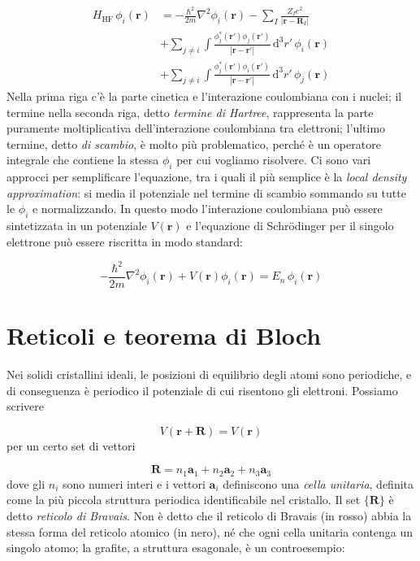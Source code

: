 \documentclass[a4paper]{report}
\begin{document}
\begin{equation}
\begin{split}
    H_{\text{HF}} \,\phi_i(\mathbf{r}) & = -\frac{\hbar^2}{2m}\nabla^2 \phi_i(\mathbf{r}) - \sum_I \frac{Z_I e^2}{|\mathbf{r}-\mathbf{R}_I|}  \\
    & + \sum_{j\neq i} \int \frac{\phi_j^{*}(\mathbf{r}') \phi_j(\mathbf{r}')}{|\mathbf{r}-\mathbf{r}'|}\,\mathrm{d}^3r'\,\phi_i(\mathbf{r}) \\
    & + \sum_{j\neq i} \int \frac{\phi_j^{*}(\mathbf{r}') \phi_i(\mathbf{r}')}{|\mathbf{r}-\mathbf{r}'|}\,\mathrm{d}^3r'\,\phi_j(\mathbf{r})
\end{split}
\end{equation}
Nella prima riga c'è la parte cinetica e l'interazione coulombiana con i nuclei; il termine nella seconda riga, detto \textit{termine di Hartree}, rappresenta la parte puramente moltiplicativa dell'interazione coulombiana tra elettroni; l'ultimo termine, detto \textit{di scambio}, è molto più problematico, perché è un operatore integrale che contiene la stessa $\phi_i$ per cui vogliamo risolvere. Ci sono vari approcci per semplificare l'equazione, tra i quali il più semplice è la \textit{local density approximation}: si media il potenziale nel termine di scambio sommando su tutte le $\phi_i$ e normalizzando. In questo modo l'interazione coulombiana può essere sintetizzata in un potenziale $V(\mathbf{r})$ e l'equazione di Schr\"odinger per il singolo elettrone può essere riscritta in modo standard:

\begin{equation}
    -\frac{\hbar^2}{2m}\nabla^2 \phi_i(\mathbf{r}) + V(\mathbf{r})\phi_i(\mathbf{r}) = E_n\,\phi_i(\mathbf{r})
    \label{schrodinger_cristallo}
\end{equation}

\section{Reticoli e teorema di Bloch}

Nei solidi cristallini ideali, le posizioni di equilibrio degli atomi sono periodiche, e di conseguenza è periodico il potenziale di cui risentono gli elettroni. Possiamo scrivere

\begin{equation}
    V(\mathbf{r}+\mathbf{R}) = V(\mathbf{r})
\end{equation}
per un certo set di vettori

\begin{equation}
    \mathbf{R} = n_1 \mathbf{a}_1 + n_2\mathbf{a}_2 + n_3 \mathbf{a}_3
\end{equation}
dove gli $n_i$ sono numeri interi e i vettori $\mathbf{a}_i$ definiscono una \textit{cella unitaria}, definita come la più piccola struttura periodica identificabile nel cristallo. Il set $\{\mathbf{R}\}$ è detto \textit{reticolo di Bravais}. Non è detto che il reticolo di Bravais (in rosso) abbia la stessa forma del reticolo atomico (in nero), né che ogni cella unitaria contenga un singolo atomo; la grafite, a struttura esagonale, è un controesempio:
\end{document}
